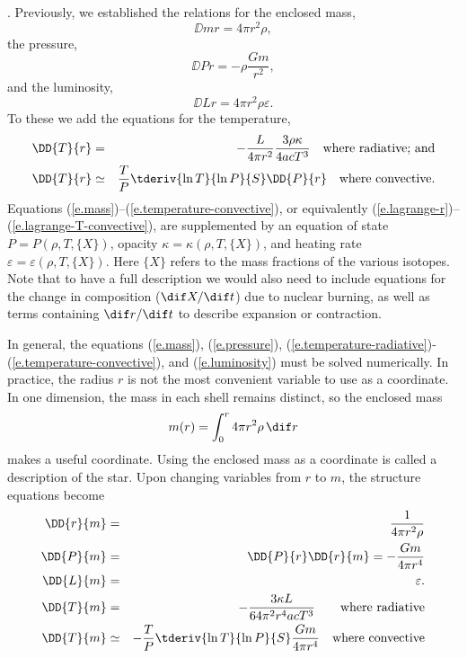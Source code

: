 . Previously, we established the relations for the enclosed mass,
\begin{equation}\label{e.mass}
\DD{m}{r} = 4\pi r^{2}\rho,
\end{equation}
the pressure,
\begin{equation}\label{e.pressure}
\DD{P}{r} = -\rho\frac{Gm}{r^{2}},
\end{equation}
and the luminosity,
\begin{equation}
\label{e.luminosity}
\DD{L}{r} = 4\pi r^{2}\rho\varepsilon.
\end{equation}
To these we add the equations for the temperature,
\begin{eqnarray}\label{e.temperature-radiative}
\DD{T}{r} &=& - \frac{L}{4\pi r^{2}}\frac{3\rho\kappa}{4ac T^{3}}\quad\textrm{where radiative; and}\\
\label{e.temperature-convective}
\DD{T}{r} &\simeq& \frac{T}{P}\tderiv{\ln T}{\ln P}{S}\DD{P}{r}\quad\textrm{where convective}.
\end{eqnarray}
Equations (\ref{e.mass})--(\ref{e.temperature-convective}), or equivalently (\ref{e.lagrange-r})--(\ref{e.lagrange-T-convective}), are supplemented by an equation of state $P = P(\rho,T,\{X\})$, opacity $\kappa = \kappa(\rho,T,\{X\})$, and heating rate $\varepsilon=\varepsilon(\rho,T,\{X\})$. Here $\{X\}$ refers to the mass fractions of the various isotopes. Note that to have a full description we would also need to include equations for the change in composition ($\dif X/\dif t$) due to nuclear burning, as well as terms containing $\dif r/\dif t$ to describe expansion or contraction.

\begin{sidebar}
\label{sb.lagrangian-equations}
In general, the equations (\ref{e.mass}), (\ref{e.pressure}), (\ref{e.temperature-radiative})-(\ref{e.temperature-convective}), and (\ref{e.luminosity}) must be solved numerically. In practice, the radius $r$ is not the most convenient variable to use as a coordinate. In one dimension, the mass in each shell remains distinct, so the enclosed mass
\[
	m(r) = \int_{0}^{r} 4\pi r^{2}\rho\,\dif r
\]
makes a useful coordinate. Using the enclosed mass as a coordinate is called a  description of the star.  Upon changing variables from $r$ to $m$, the structure equations become
\begin{eqnarray}
\DD{r}{m} &=& \frac{1}{4\pi r^{2}\rho}\label{e.lagrange-r}\\
\DD{P}{m} &=& \DD{P}{r}\DD{r}{m} = -\frac{Gm}{4\pi r^{4}}\label{e.lagrange-P}\\
\DD{L}{m} &=& \varepsilon.\label{e.lagrange-L}\\
\DD{T}{m} &=& - \frac{3\kappa L}{64\pi^{2} r^{4} acT^{3}}\qquad \textrm{where radiative}\label{e.lagrange-T-radiative}\\
\DD{T}{m} &\simeq& -\frac{T}{P}\tderiv{\ln T}{\ln P}{S}\frac{Gm}{4\pi r^{4}} \quad \textrm{where convective}\label{e.lagrange-T-convective}
\end{eqnarray}
\end{sidebar}

